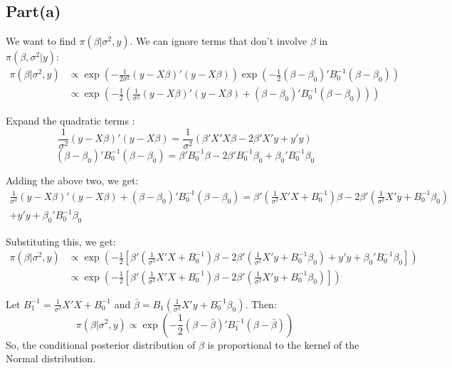\documentclass[a4paper]{article}
\begin{document}
\subsection*{Part(a)}

We want to find $\pi(\beta | \sigma^2, y)$. We can ignore terms that don't involve $\beta$ in \(\pi(\beta,\sigma^2|y)\):
    \begin{align*}
        \pi(\beta | \sigma^2, y) &\propto \exp\left(-\frac{1}{2\sigma^2}(y - X\beta)'(y - X\beta)\right) \exp\left(-\frac{1}{2}(\beta - \beta_0)' B_0^{-1} (\beta - \beta_0)\right)\\
        &\propto \exp\left(-\frac{1}{2}\left(\frac{1}{\sigma^2}(y - X\beta)'(y - X\beta)+(\beta - \beta_0)' B_0^{-1} (\beta - \beta_0)\right)\right)
    \end{align*}
    
    Expand the quadratic terms :
    $$\frac{1}{\sigma^2}(y - X\beta)'(y - X\beta) = \frac{1}{\sigma^2}\left(\beta' X' X \beta - 2\beta' X' y + y'y\right) $$
    $$(\beta - \beta_0)' B_0^{-1} (\beta - \beta_0) = \beta' B_0^{-1} \beta - 2\beta' B_0^{-1} \beta_0 + \beta_0' B_0^{-1} \beta_0$$

    Adding the above two, we get:
    \begin{align*}
        \frac{1}{\sigma^2}(y - X\beta)'(y - X\beta)+(\beta - \beta_0)' B_0^{-1} (\beta - \beta_0) =  \beta' \left(\frac{1}{\sigma^2} X' X + B_0^{-1}\right) \beta - 2\beta'\left(\frac{1}{\sigma^2} X' y + B_0^{-1} \beta_0\right) \\
    + y'y + \beta_0'B_0^{-1}\beta_0
    \end{align*}


    Substituting this, we get:
    \begin{align*}
        \pi(\beta | \sigma^2, y) &\propto \exp\left(-\frac{1}{2} \left[ \beta' \left(\frac{1}{\sigma^2} X' X + B_0^{-1}\right) \beta - 2\beta'\left(\frac{1}{\sigma^2} X' y + B_0^{-1} \beta_0\right) + y'y + \beta_0'B_0^{-1}\beta_0 \right]\right)\\
        & \propto \exp\left(-\frac{1}{2} \left[ \beta' \left(\frac{1}{\sigma^2} X' X + B_0^{-1}\right) \beta - 2\beta' \left(\frac{1}{\sigma^2} X' y + B_0^{-1} \beta_0\right) \right] \right)
    \end{align*}

    Let $B_1^{-1} = \frac{1}{\sigma^2} X' X + B_0^{-1}$ and $\bar{\beta} = B_1 \left(\frac{1}{\sigma^2} X' y + B_0^{-1} \beta_0\right)$. Then:
    $$\pi(\beta | \sigma^2, y) \propto \exp\left(-\frac{1}{2} (\beta - \bar{\beta})' B_1^{-1} (\beta - \bar{\beta}) \right)$$
    So, the conditional posterior distribution of \(\beta\) is proportional to the kernel of the Normal distribution.
\end{document}
